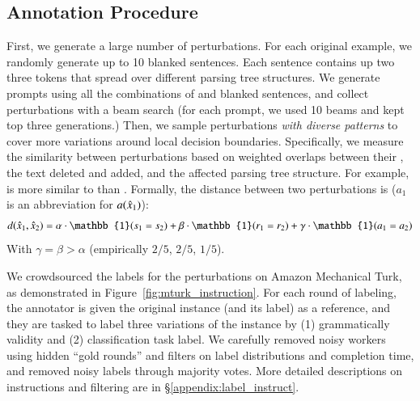 \subsection{Annotation Procedure}
\label{subsec:label_procedure}
First, we generate a large number of perturbations.
For each original example, we randomly generate up to 10 blanked sentences. Each sentence contains up two three \BLANK tokens that spread over different parsing tree structures.
We generate prompts using all the combinations of \tagstrs and blanked sentences, and collect perturbations with a beam search (for each prompt, we used 10 beams and kept top three generations.)
Then, we sample perturbations \emph{with diverse patterns} to cover more variations around local decision boundaries.
Specifically, we measure the similarity between perturbations based on weighted overlaps between their \tagstrs, the text deleted and added, and the affected parsing tree structure. 
For example, \ctrltag{[lexical]}  is more similar to \ctrltag{[lexical]}  than \ctrltag{[quantifier]} .
Formally, the distance between two perturbations is ($a_1$ is an abbreviation for $a(\hat{x}_1)$):
$$d(\xp_1, \xp_2) = \alpha\cdot\mathbb{1}(s_1 = s_2) + \beta\cdot\mathbb{1}(r_1 = r_2) + \gamma\cdot\mathbb{1}(a_1=a_2)$$
With $\gamma = \beta > \alpha$ (empirically $2/5$, $2/5$, $1/5$).


We crowdsourced the labels for the perturbations on Amazon Mechanical Turk, as demonstrated in Figure~\ref{fig:mturk_instruction}. 
For each round of labeling, the annotator is given the original instance (and its label) as a reference, and they are tasked to label three variations of the instance by (1) grammatically validity and (2) classification task label. 
We carefully removed noisy workers using hidden ``gold rounds'' and filters on label distributions and completion time, and removed noisy labels through majority votes.
More detailed descriptions on instructions and filtering are in \S\ref{appendix:label_instruct}. 




